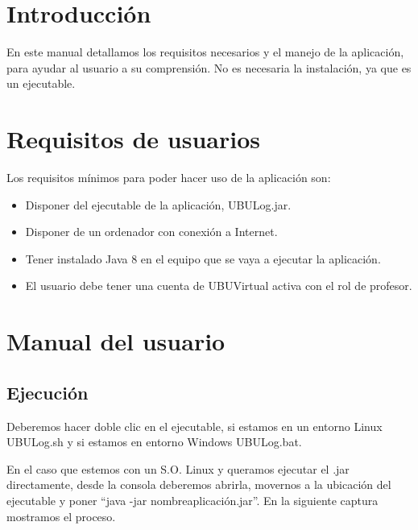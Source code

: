 
\section{Introducción}

En este manual detallamos los requisitos necesarios y el manejo de la aplicación, para ayudar al usuario a su comprensión. No es necesaria la instalación, ya que es un ejecutable.

\section{Requisitos de usuarios}

Los requisitos mínimos para poder hacer uso de la aplicación son:

\begin{itemize}
	\tightlist
	\item
	Disponer del ejecutable de la aplicación, UBULog.jar.
	\item
	Disponer de un ordenador con conexión a Internet.
	\item
	Tener instalado Java 8 en el equipo que se vaya a ejecutar la aplicación.
	\item
	El usuario debe tener una cuenta de UBUVirtual activa con el rol de profesor.
\end{itemize}


\section{Manual del usuario}

\subsection{Ejecución}

Deberemos hacer doble clic en el ejecutable, si estamos en un entorno Linux UBULog.sh y si estamos en entorno Windows UBULog.bat.

En el caso que estemos con un S.O. Linux y queramos ejecutar el .jar directamente, desde la consola deberemos abrirla, movernos a la ubicación del ejecutable y poner ``java -jar nombreaplicación.jar''. En la siguiente captura mostramos el proceso.

